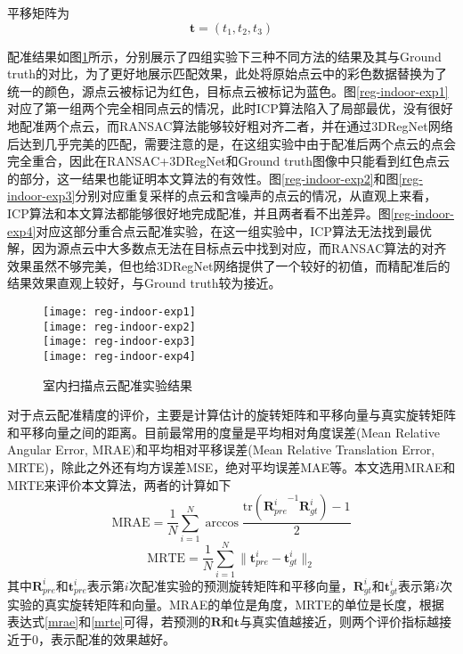 平移矩阵为
\begin{equation}
	\boldsymbol{t} = (t_1, t_2, t_3)
\end{equation}

配准结果如图\ref{reg-indoor-exp}所示，分别展示了四组实验下三种不同方法的结果及其与Ground truth的对比，为了更好地展示匹配效果，此处将原始点云中的彩色数据替换为了统一的颜色，源点云被标记为红色，目标点云被标记为蓝色。图\ref{reg-indoor-exp1}对应了第一组两个完全相同点云的情况，此时ICP算法陷入了局部最优，没有很好地配准两个点云，而RANSAC算法能够较好粗对齐二者，并在通过3DRegNet网络后达到几乎完美的匹配，需要注意的是，在这组实验中由于配准后两个点云的点会完全重合，因此在RANSAC+3DRegNet和Ground truth图像中只能看到红色点云的部分，这一结果也能证明本文算法的有效性。图\ref{reg-indoor-exp2}和图\ref{reg-indoor-exp3}分别对应重复采样的点云和含噪声的点云的情况，从直观上来看，ICP算法和本文算法都能够很好地完成配准，并且两者看不出差异。图\ref{reg-indoor-exp4}对应这部分重合点云配准实验，在这一组实验中，ICP算法无法找到最优解，因为源点云中大多数点无法在目标点云中找到对应，而RANSAC算法的对齐效果虽然不够完美，但也给3DRegNet网络提供了一个较好的初值，而精配准后的结果效果直观上较好，与Ground truth较为接近。

\begin{figure}
	\centering
	{\texttt{[image: reg-indoor-exp1]}}\\
	{\texttt{[image: reg-indoor-exp2]}}\\
	{\texttt{[image: reg-indoor-exp3]}}\\
	{\texttt{[image: reg-indoor-exp4]}}\\
	\caption{室内扫描点云配准实验结果}
	\label{reg-indoor-exp}
\end{figure}

对于点云配准精度的评价，主要是计算估计的旋转矩阵和平移向量与真实旋转矩阵和平移向量之间的距离。目前最常用的度量是平均相对角度误差(Mean Relative Angular Error, MRAE)和平均相对平移误差(Mean Relative Translation Error, MRTE)，除此之外还有均方误差MSE，绝对平均误差MAE等。本文选用MRAE和MRTE来评价本文算法，两者的计算如下
\begin{equation}
	\label{mrae}
	\text{MRAE} = \frac{1}{N}\sum_{i=1}^N \arccos \frac{\text{tr}({\boldsymbol{R}_{pre}^i}^{-1}\boldsymbol{R}_{gt}^i)-1}{2}
\end{equation}
\begin{equation}
	\label{mrte}
	\text{MRTE} = \frac{1}{N}\sum_{i=1}^N \| \boldsymbol{t}_{pre}^i - \boldsymbol{t}_{gt}^i\|_2
\end{equation}
其中$\boldsymbol{R}_{pre}^i$和$\boldsymbol{t}_{pre}^i$表示第$i$次配准实验的预测旋转矩阵和平移向量，$\boldsymbol{R}_{gt}^i$和$\boldsymbol{t}_{gt}^i$表示第$i$次实验的真实旋转矩阵和向量。MRAE的单位是角度，MRTE的单位是长度，根据表达式\ref{mrae}和\ref{mrte}可得，若预测的$\boldsymbol{R}$和$\boldsymbol{t}$与真实值越接近，则两个评价指标越接近于0，表示配准的效果越好。

